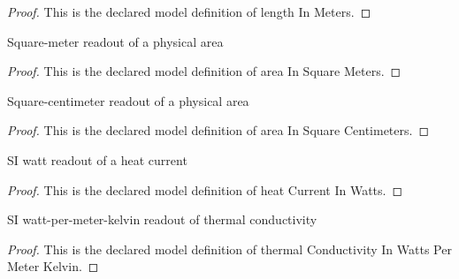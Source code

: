 \begin{proof}
  This is the declared model definition of length In Meters.
\end{proof}
\begin{definition}
  \label{def:physics:phyx-mini-0331:phyxminiproblems-problemphyxmini0331-areainsquaremeters}
  Square-meter readout of a physical area
\end{definition}
\begin{proof}
  This is the declared model definition of area In Square Meters.
\end{proof}
\begin{definition}
  \label{def:physics:phyx-mini-0331:phyxminiproblems-problemphyxmini0331-areainsquarecentimeters}
  Square-centimeter readout of a physical area
\end{definition}
\begin{proof}
  This is the declared model definition of area In Square Centimeters.
\end{proof}
\begin{definition}
  \label{def:physics:phyx-mini-0331:phyxminiproblems-problemphyxmini0331-heatcurrentinwatts}
  SI watt readout of a heat current
\end{definition}
\begin{proof}
  This is the declared model definition of heat Current In Watts.
\end{proof}
\begin{definition}
  \label{def:physics:phyx-mini-0331:phyxminiproblems-problemphyxmini0331-thermalconductivityinwattspermeterkelvin}
  SI watt-per-meter-kelvin readout of thermal conductivity
\end{definition}
\begin{proof}
  This is the declared model definition of thermal Conductivity In Watts Per Meter Kelvin.
\end{proof}
